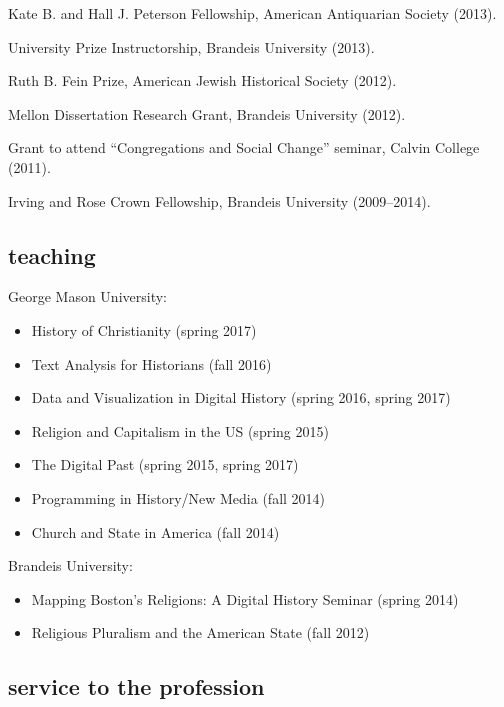 \documentclass[11pt]{article}
\providecommand{\tightlist}{%
  \setlength{\itemsep}{0pt}\setlength{\parskip}{0pt}}
\begin{document}
Kate B. and Hall J. Peterson Fellowship, American Antiquarian Society (2013).

University Prize Instructorship, Brandeis University (2013).

Ruth B. Fein Prize, American Jewish Historical Society (2012).

Mellon Dissertation Research Grant, Brandeis University (2012).

Grant to attend ``Congregations and Social Change'' seminar, Calvin College 
(2011).

Irving and Rose Crown Fellowship, Brandeis University (2009--2014).

\subsection{teaching}\label{teaching}

George Mason University:

\vspace{-0.15in}

\begin{itemize}
    \tightlist
  \item History of Christianity (spring 2017)
  \item Text Analysis for Historians (fall 2016)
  \item Data and Visualization in Digital History (spring 2016, spring 2017)
  \item Religion and Capitalism in the US (spring 2015) 
  \item The Digital Past (spring 2015, spring 2017)
  \item Programming in History/New Media (fall 2014) 
  \item Church and State in America (fall 2014)
\end{itemize}

\vspace{-0.1in}

Brandeis University:

\vspace{-0.15in}

\begin{itemize}
    \tightlist
  \item
    Mapping Boston's Religions: A Digital History Seminar (spring 2014)
  \item
    Religious Pluralism and the American State (fall 2012)
\end{itemize}

\subsection{service to the profession}\label{service-profession}
\end{document}
